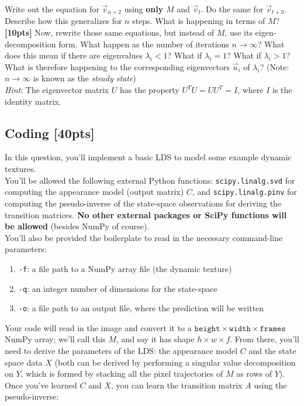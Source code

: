 \documentclass[paper=a4, fontsize=11pt]{scrartcl} %
\numberwithin{figure}{section} %
\numberwithin{table}{section} %
\begin{document}
Write out the equation for $\vec{v}_{n + 2}$ using \textbf{only} $M$ and $\vec{v}_t$. Do the same for $\vec{v}_{t + 3}$. Describe how this generalizes for $n$ steps. What is happening in terms of $M$? \\

\textbf{[10pts]} Now, rewrite those same equations, but instead of $M$, use its eigen-decomposition form. What happen as the number of iterations $n \rightarrow \infty$? What does this mean if there are eigenvalues $\lambda_i < 1$? What if $\lambda_i = 1$? What if $\lambda_i > 1$? What is therefore happening to the corresponding eigenvectors $\vec{u}_i$ of $\lambda_i$? (Note: $n \rightarrow \infty$ is known as the \emph{steady state}) \\ 

\emph{Hint}: The eigenvector matrix $U$ has the property $U^TU = UU^T = I$, where $I$ is the identity matrix.

\subsection{Coding \textbf{[40pts]}}

In this question, you'll implement a basic LDS to model some example dynamic textures. \\

You'll be allowed the following external Python functions: \texttt{scipy.linalg.svd} for computing the appearance model (output matrix) $C$, and \texttt{scipy.linalg.pinv} for computing the pseudo-inverse of the state-space observations for deriving the transition matrices. \textbf{No other external packages or SciPy functions will be allowed} (besides NumPy of course). \\

You'll also be provided the boilerplate to read in the necessary command-line parameters:

\begin{enumerate}
	\item \texttt{-f}: a file path to a NumPy array file (the dynamic texture)
	\item \texttt{-q}: an integer number of dimensions for the state-space
	\item \texttt{-o}: a file path to an output file, where the prediction will be written
\end{enumerate}

Your code will read in the image and convert it to a $\texttt{height} \times \texttt{width} \times \texttt{frames}$ NumPy array; we'll call this $M$, and say it has shape $h \times w \times f$. From there, you'll need to derive the parameters of the LDS: the appearance model $C$ and the state space data $X$ (both can be derived by performing a singular value decomposition on $Y$, which is formed by stacking all the pixel trajectories of $M$ as rows of $Y$). Once you've learned $C$ and $X$, you can learn the transition matrix $A$ using the pseudo-inverse:
\end{document}
